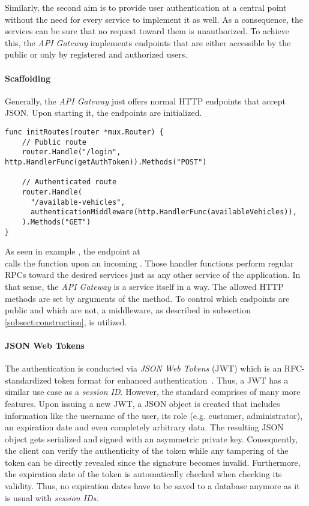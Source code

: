 \documentclass[12pt,a4paper,twoside]{report}
\begin{document}
Similarly, the second aim is to provide user authentication
at a central point without the need for every service to implement it as well.
As a consequence, the services can be sure that no request toward them is unauthorized.
To achieve this, the \textit{API Gateway} implements endpoints that are either
accessible by the public or only by registered and authorized users.

\paragraph{Scaffolding}
Generally, the \textit{API Gateway} just offers normal HTTP endpoints that accept
JSON. Upon starting it, the endpoints are initialized.

\begin{lstlisting}[title=api-gateway/main.go, float, floatplacement=H]
func initRoutes(router *mux.Router) {
	// Public route
	router.Handle("/login", http.HandlerFunc(getAuthToken)).Methods("POST")

	// Authenticated route
	router.Handle(
      "/available-vehicles",
      authenticationMiddleware(http.HandlerFunc(availableVehicles)),
    ).Methods("GET")
}
\end{lstlisting}

As seen in example , the endpoint at\\
 calls the function 
upon an incoming .
Those handler functions perform regular RPCs toward the desired services just
as any other service of the application. In that sense, the \textit{API Gateway}
is a service itself in a way.
The allowed HTTP methods are set by arguments of the  method.
To control which endpoints are public and which are not, a middleware, as described
in subsection \ref{subsect:construction}, is utilized.

\paragraph{JSON Web Tokens}
The authentication is conducted via \textit{JSON Web Tokens} (JWT) which is
an RFC-standardized token format for enhanced authentication~\cite{jwt-rfc}.
Thus, a JWT has a similar use case as a \textit{session ID}.
However, the standard comprises of many more features.
Upon issuing a new JWT, a JSON object is created that includes information
like the username of the user, its role (e.g. customer, administrator), an
expiration date and even completely arbitrary data.
The resulting JSON object gets serialized and signed with an asymmetric
private key. Consequently, the client can verify the authenticity of the token
while any tampering of the token can be directly revealed since the signature becomes
invalid. Furthermore, the expiration date of the token is automatically checked
when checking its validity. Thus, no expiration dates have to be saved to
a database anymore as it is usual with \textit{session IDs}.
\end{document}
